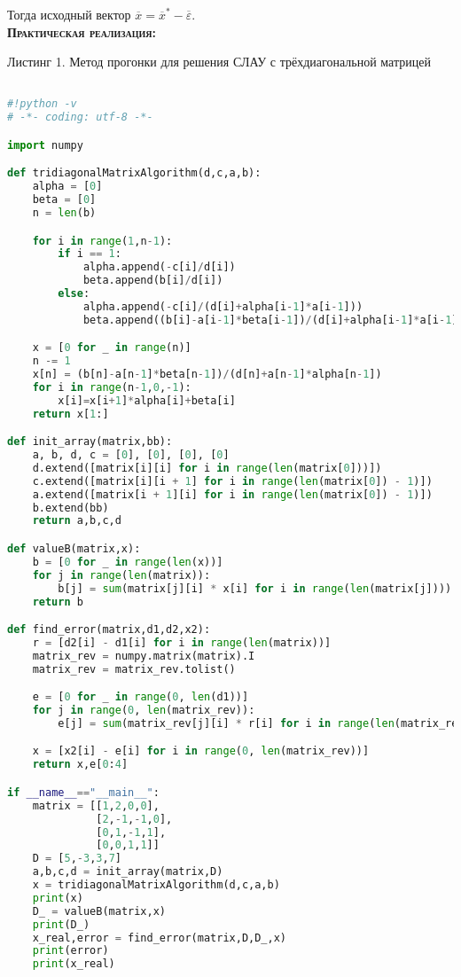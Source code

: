 \documentclass [12pt]{article}
\begin{document}
Тогда исходный вектор $ \overline{x} = \overline{x}^* - \overline{\varepsilon}$.
\\

\textsc{\textbf{Практическая реализация:}}

Листинг 1. Метод прогонки для решения СЛАУ с трёхдиагональной матрицей
\begin{lstlisting}[language=python]

#!python -v
# -*- coding: utf-8 -*-

import numpy

def tridiagonalMatrixAlgorithm(d,c,a,b):
    alpha = [0]
    beta = [0]
    n = len(b)

    for i in range(1,n-1):
        if i == 1:
            alpha.append(-c[i]/d[i])
            beta.append(b[i]/d[i])
        else:
            alpha.append(-c[i]/(d[i]+alpha[i-1]*a[i-1]))
            beta.append((b[i]-a[i-1]*beta[i-1])/(d[i]+alpha[i-1]*a[i-1]))

    x = [0 for _ in range(n)]
    n -= 1
    x[n] = (b[n]-a[n-1]*beta[n-1])/(d[n]+a[n-1]*alpha[n-1])
    for i in range(n-1,0,-1):
        x[i]=x[i+1]*alpha[i]+beta[i]
    return x[1:]

def init_array(matrix,bb):
    a, b, d, c = [0], [0], [0], [0]
    d.extend([matrix[i][i] for i in range(len(matrix[0]))])
    c.extend([matrix[i][i + 1] for i in range(len(matrix[0]) - 1)])
    a.extend([matrix[i + 1][i] for i in range(len(matrix[0]) - 1)])
    b.extend(bb)
    return a,b,c,d

def valueB(matrix,x):
    b = [0 for _ in range(len(x))]
    for j in range(len(matrix)):
        b[j] = sum(matrix[j][i] * x[i] for i in range(len(matrix[j])))
    return b

def find_error(matrix,d1,d2,x2):
    r = [d2[i] - d1[i] for i in range(len(matrix))]
    matrix_rev = numpy.matrix(matrix).I
    matrix_rev = matrix_rev.tolist()

    e = [0 for _ in range(0, len(d1))]
    for j in range(0, len(matrix_rev)):
        e[j] = sum(matrix_rev[j][i] * r[i] for i in range(len(matrix_rev[j])))

    x = [x2[i] - e[i] for i in range(0, len(matrix_rev))]
    return x,e[0:4]

if __name__=="__main__":
    matrix = [[1,2,0,0],
              [2,-1,-1,0],
              [0,1,-1,1],
              [0,0,1,1]]
    D = [5,-3,3,7]
    a,b,c,d = init_array(matrix,D)
    x = tridiagonalMatrixAlgorithm(d,c,a,b)
    print(x)
    D_ = valueB(matrix,x)
    print(D_)
    x_real,error = find_error(matrix,D,D_,x)
    print(error)
    print(x_real)


\end{lstlisting}
\end{document}
